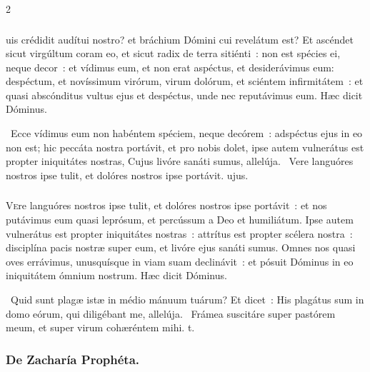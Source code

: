 \documentclass[9pt,twoside]{extarticle}
\begin{document}
\begin{multicols}{2}
{{\subsubsection*{\center {}}
uis crédidit audítui nostro? et bráchium Dómini cui revelátum est?
Et ascéndet sicut virgúltum coram eo, et sicut radix de terra sitiénti~: non est spécies ei, neque decor~: et vídimus eum, et non erat aspéctus, et desiderávimus eum:
despéctum, et novíssimum virórum, virum dolórum, et sciéntem infirmitátem~: et quasi abscónditus vultus ejus et despéctus, unde nec reputávimus eum. Hæc dicit Dóminus.

\begin{tightlist}{}
\item {}~Ecce vídimus eum non habéntem spéciem, neque decórem~: adspéctus ejus in eo non est; hic peccáta nostra portávit, et pro nobis dolet, ipse autem vulnerátus est propter iniquitátes nostras, \textred{*} Cujus livóre sanáti sumus, allelúja. ~Vere languóres nostros ipse tulit, et dolóres nostros ipse portávit. ujus.
\end{tightlist}

\subsubsection*{\center {}}
\lettrine{V}ere languóres nostros ipse tulit, et dolóres nostros ipse portávit~: et nos putávimus eum quasi leprósum, et percússum a Deo et humiliátum.
Ipse autem vulnerátus est propter iniquitátes nostras~: attrítus est propter scélera nostra~: disciplína pacis nostræ super eum, et livóre ejus sanáti sumus.
Omnes nos quasi oves errávimus, unusquísque in viam suam declinávit~: et pósuit Dóminus in eo iniquitátem ómnium nostrum. Hæc dicit Dóminus.

\begin{tightlist}{}
\item {}~Quid sunt plagæ istæ in médio mánuum tuárum? \textred{*} Et dicet~: His plagátus sum in domo eórum, qui diligébant me, allelúja. ~Frámea suscitáre super pastórem meum, et super virum cohæréntem mihi. t.
\end{tightlist}

\subsubsection*{\center De Zacharía Prophéta.}
}}
\end{multicols}
\end{document}
